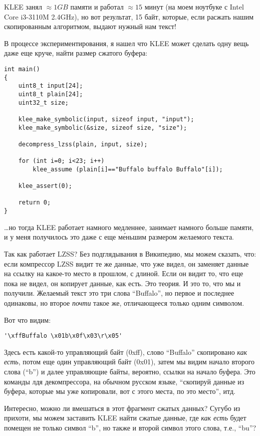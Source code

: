 KLEE занял $\approx 1GB$ памяти и работал $\approx 15$ минут (на моем ноутбуке с Intel Core i3-3110M 2.4GHz), 
но вот результат, 15 байт, которые, если расжать нашим скопированным алгоритмом, выдают нужный нам текст!

В процессе экспериментирования, я нашел что KLEE может сделать одну вещь даже еще круче, найти размер сжатого буфера:

\begin{lstlisting}
int main()
{
	uint8_t input[24];
	uint8_t plain[24];
	uint32_t size;
  
	klee_make_symbolic(input, sizeof input, "input");
	klee_make_symbolic(&size, sizeof size, "size");
	
	decompress_lzss(plain, input, size);

	for (int i=0; i<23; i++)
		klee_assume (plain[i]=="Buffalo buffalo Buffalo"[i]);

	klee_assert(0);
	
	return 0;
}
\end{lstlisting}

\dots но тогда KLEE работает намного медленнее, занимает намного больше памяти, и у меня получилось это даже с еще
м\'{е}ньшим размером желаемого текста.

Так как работает \ac{LZSS}? Без подглядывания в Википедию, мы можем сказать, что:
если компрессор \ac{LZSS} видит те же данные, что уже видел, он заменяет данные на ссылку на какое-то место в прошлом, с длиной.
Если он видит то, что еще пока не видел, он копирует данные, как есть.
Это теория.
И это то, что мы и получили. Желаемый текст это три слова ``Buffalo'', но первое и последнее одинаковы,
но второе \textit{почти} такое же, отличающееся только одним символом.

Вот что видим:

\begin{lstlisting}
'\xffBuffalo \x01b\x0f\x03\r\x05'
\end{lstlisting}

Здесь есть какой-то управляющий байт (0xff), слово ``Buffalo'' скопировано \textit{как есть}, потом еще один управляющий байт
(0x01), 
затем мы видим начало второго слова (``b'') и далее управляющие байты, вероятно, ссылки на начало буфера.
Это команды лдя декомпрессора, на обычном русском языке, ``скопируй данные из буфера, которые мы уже копировали,
вот с этого места, по это место'', итд.

Интересно, можно ли вмешаться в этот фрагмент сжатых данных?
Сугубо из прихоти, мы можем заставить KLEE найти сжатые данные,
где \textit{как есть} будет помещен не только символ ``b'', но также и второй символ этого слова, т.е., ``bu''?

